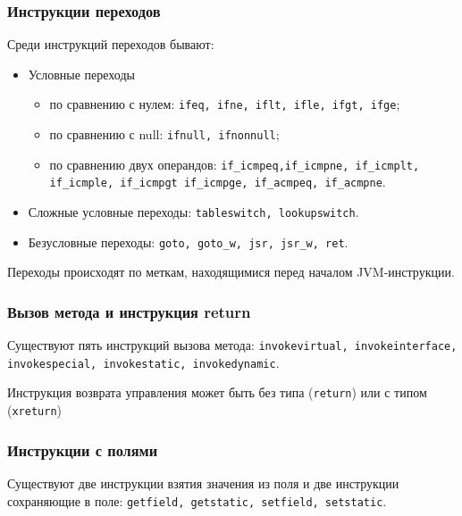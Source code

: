 \documentclass[14pt]{extarticle}
\begin{document}
\subsubsection*{Инструкции переходов}
Среди инструкций переходов бывают:
\begin{itemize}
\item Условные переходы
\begin{itemize}
\item по сравнению с нулем: \texttt{ifeq, ifne, iflt, ifle, ifgt, ifge};
\item по сравнению с null: \texttt{ifnull, ifnonnull};
\item по сравнению двух операндов: \texttt{if\_icmpeq,if\_icmpne, if\_icmplt, if\_icmple, if\_icmpgt if\_icmpge, if\_acmpeq, if\_acmpne}.
\end{itemize}
\item Сложные условные переходы: \texttt{tableswitch, lookupswitch}.
\item Безусловные переходы: \texttt{goto, goto\_w, jsr, jsr\_w, ret}.
\end{itemize}
Переходы происходят по меткам, находящимися перед началом JVM-инструкции.

\subsubsection*{Вызов метода и инструкция return}
Существуют пять инструкций вызова метода: \texttt{invokevirtual, invokeinterface, invokespecial, invokestatic, invokedynamic}.

Инструкция возврата управления может быть без типа (\texttt{return}) или с типом (\texttt{xreturn})
\subsubsection*{Инструкции с полями}
Существуют две инструкции взятия значения из поля и две инструкции сохраняющие в поле: \texttt{getfield, getstatic, setfield, setstatic}.
\newpage
\end{document}
